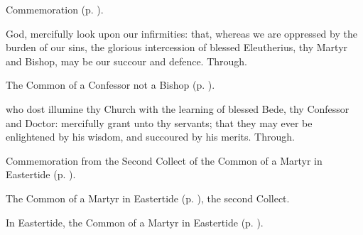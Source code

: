 \begin{rubric}
	Commemoration  (p. \pageref{EleutheriusCollect}).
\end{rubric}


\clearpage
{}


\memorialCollect\label{EleutheriusCollect}
 God, mercifully look upon our infirmities: that, whereas we are oppressed by the burden of our sins, the glorious intercession of blessed Eleutherius, thy Martyr and Bishop, may be our succour and defence. Through.



\begin{rubric}
	The Common of a Confessor not a Bishop (p. \pageref{CommonConfessorNotBishop}).
\end{rubric}

{} who dost illumine thy Church with the learning of blessed Bede, thy Confessor and Doctor: mercifully grant unto thy servants; that they may ever be enlightened by his wisdom, and succoured by his merits. Through.

\begin{rubric}
	Commemoration  from the Second Collect of the Common of a Martyr in Eastertide (p. \pageref{CommonMartyrBishopEasterCollect}).
\end{rubric}



\begin{rubric}
	The Common of a Martyr in Eastertide (p. \pageref{CommonMartyrBishopEasterCollect}), the second Collect.
\end{rubric}



\begin{rubric}
	In Eastertide, the Common of a Martyr in Eastertide (p. \pageref{CommonMartyrBishopEasterCollect}).
\end{rubric}

